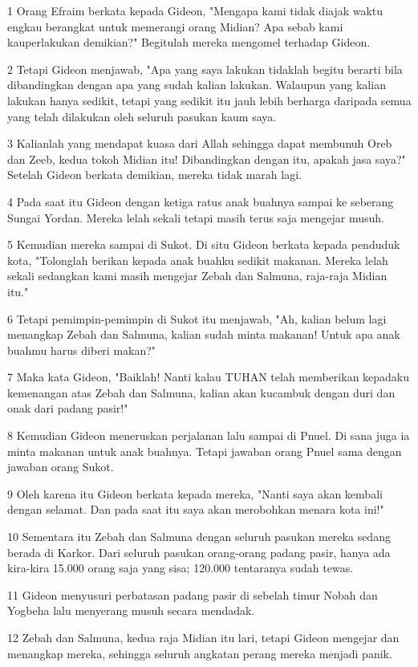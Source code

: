 \par 1 Orang Efraim berkata kepada Gideon, "Mengapa kami tidak diajak waktu engkau berangkat untuk memerangi orang Midian? Apa sebab kami kauperlakukan demikian?" Begitulah mereka mengomel terhadap Gideon.
\par 2 Tetapi Gideon menjawab, "Apa yang saya lakukan tidaklah begitu berarti bila dibandingkan dengan apa yang sudah kalian lakukan. Walaupun yang kalian lakukan hanya sedikit, tetapi yang sedikit itu jauh lebih berharga daripada semua yang telah dilakukan oleh seluruh pasukan kaum saya.
\par 3 Kalianlah yang mendapat kuasa dari Allah sehingga dapat membunuh Oreb dan Zeeb, kedua tokoh Midian itu! Dibandingkan dengan itu, apakah jasa saya?" Setelah Gideon berkata demikian, mereka tidak marah lagi.
\par 4 Pada saat itu Gideon dengan ketiga ratus anak buahnya sampai ke seberang Sungai Yordan. Mereka lelah sekali tetapi masih terus saja mengejar musuh.
\par 5 Kemudian mereka sampai di Sukot. Di situ Gideon berkata kepada penduduk kota, "Tolonglah berikan kepada anak buahku sedikit makanan. Mereka lelah sekali sedangkan kami masih mengejar Zebah dan Salmuna, raja-raja Midian itu."
\par 6 Tetapi pemimpin-pemimpin di Sukot itu menjawab, "Ah, kalian belum lagi menangkap Zebah dan Salmuna, kalian sudah minta makanan! Untuk apa anak buahmu harus diberi makan?"
\par 7 Maka kata Gideon, "Baiklah! Nanti kalau TUHAN telah memberikan kepadaku kemenangan atas Zebah dan Salmuna, kalian akan kucambuk dengan duri dan onak dari padang pasir!"
\par 8 Kemudian Gideon meneruskan perjalanan lalu sampai di Pnuel. Di sana juga ia minta makanan untuk anak buahnya. Tetapi jawaban orang Pnuel sama dengan jawaban orang Sukot.
\par 9 Oleh karena itu Gideon berkata kepada mereka, "Nanti saya akan kembali dengan selamat. Dan pada saat itu saya akan merobohkan menara kota ini!"
\par 10 Sementara itu Zebah dan Salmuna dengan seluruh pasukan mereka sedang berada di Karkor. Dari seluruh pasukan orang-orang padang pasir, hanya ada kira-kira 15.000 orang saja yang sisa; 120.000 tentaranya sudah tewas.
\par 11 Gideon menyusuri perbatasan padang pasir di sebelah timur Nobah dan Yogbeha lalu menyerang musuh secara mendadak.
\par 12 Zebah dan Salmuna, kedua raja Midian itu lari, tetapi Gideon mengejar dan menangkap mereka, sehingga seluruh angkatan perang mereka menjadi panik.
